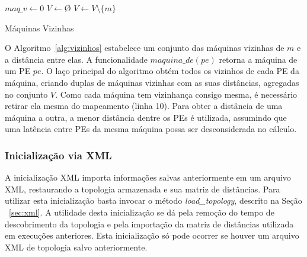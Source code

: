 \begin{algorithm}
    \DontPrintSemicolon
    \BlankLine
    
    $maq\_v \leftarrow 0$\; 
    $V \leftarrow $\O\;
    $V \leftarrow V \setminus \{m\}$\;
\caption{Máquinas Vizinhas}
\label{alg:vizinhos}
\end{algorithm}

O Algoritmo~\ref{alg:vizinhos} estabelece um conjunto das máquinas vizinhas de $m$ e a distância entre elas.
A funcionalidade $maquina\_de(pe)$ retorna a máquina de um PE $pe$.
O laço principal do algoritmo obtém todos os vizinhos de cada PE da máquina, criando duplas de máquinas vizinhas com as suas distâncias, agregadas no conjunto $V$.
Como cada máquina tem vizinhança consigo mesma, é necessário retirar ela mesma do mapeamento (linha 10).
Para obter a distância de uma máquina a outra, a menor distância dentre os PEs é utilizada, assumindo que uma latência entre PEs da mesma máquina possa ser desconsiderada no cálculo.

\subsubsection{Inicialização via XML}

A inicialização XML importa informações salvas anteriormente em um arquivo XML, restaurando a topologia armazenada e sua matriz de distâncias.
Para utilizar esta inicialização basta invocar o método \textit{load\_topology}, descrito na Seção ~\ref{sec:xml}.
A utilidade desta inicialização se dá pela remoção do tempo de descobrimento da topologia e pela importação da matriz de distâncias utilizada em execuções anteriores.
Esta inicialização só pode ocorrer se houver um arquivo XML de topologia salvo anteriormente.


